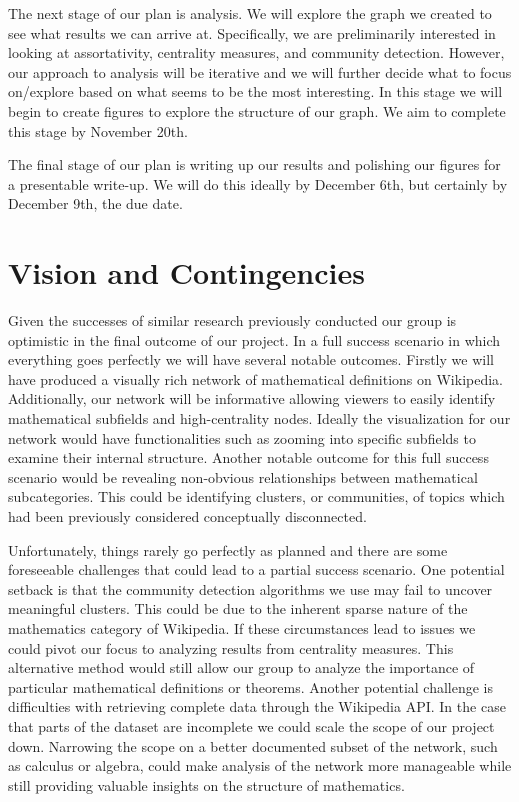 \documentclass[10pt]{paper}
\begin{document}
The next stage of our plan is analysis. We will explore the graph we created to see what results we can arrive at. 
Specifically, we are preliminarily interested in looking at assortativity, centrality measures, and community detection. 
However, our approach to analysis will be iterative and we will further decide what to focus on/explore based on what seems to be the most interesting. 
In this stage we will begin to create figures to explore the structure of our graph. We aim to complete this stage by November 20th. 

The final stage of our plan is writing up our results and polishing our figures for a presentable write-up. We will do this ideally by December 6th, but certainly by December 9th, the due date. 

\section{Vision and Contingencies}
Given the successes of similar research previously conducted our group is optimistic in the final outcome of our project. 
In a full success scenario in which everything goes perfectly we will have several notable outcomes. 
Firstly we will have produced a visually rich network of mathematical definitions on Wikipedia. 
Additionally, our network will be informative allowing viewers to easily identify mathematical subfields and high-centrality nodes. 
Ideally the visualization for our network would have functionalities such as zooming into specific subfields to examine their internal structure. 
Another notable outcome for this full success scenario would be revealing non-obvious relationships between mathematical subcategories. 
This could be identifying clusters, or communities, of topics which had been previously considered conceptually disconnected. 

Unfortunately, things rarely go perfectly as planned and there are some foreseeable challenges that could lead to a partial success scenario. 
One potential setback is that the community detection algorithms we use may fail to uncover meaningful clusters. 
This could be due to the inherent sparse nature \cite{silva2011investigating} of the mathematics category of Wikipedia. 
If these circumstances lead to issues we could pivot our focus to analyzing results from centrality measures. 
This alternative method would still allow our group to analyze the importance of particular mathematical definitions or theorems. 
Another potential challenge is difficulties with retrieving complete data through the Wikipedia API. 
In the case that parts of the dataset are incomplete we could scale the scope of our project down. 
Narrowing the scope on a better documented subset of the network, such as calculus or algebra, could make analysis of the network more manageable while still providing valuable insights on the structure of mathematics.  
\end{document}
